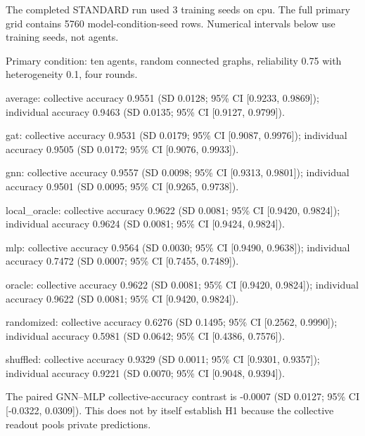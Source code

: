 The completed STANDARD run used 3 training seeds on cpu. The full primary grid contains 5760 model-condition-seed rows. Numerical intervals below use training seeds, not agents.\par
Primary condition: ten agents, random connected graphs, reliability 0.75 with heterogeneity 0.1, four rounds.\par
average: collective accuracy 0.9551 (SD 0.0128; 95\% CI [0.9233, 0.9869]); individual accuracy 0.9463 (SD 0.0135; 95\% CI [0.9127, 0.9799]).\par
gat: collective accuracy 0.9531 (SD 0.0179; 95\% CI [0.9087, 0.9976]); individual accuracy 0.9505 (SD 0.0172; 95\% CI [0.9076, 0.9933]).\par
gnn: collective accuracy 0.9557 (SD 0.0098; 95\% CI [0.9313, 0.9801]); individual accuracy 0.9501 (SD 0.0095; 95\% CI [0.9265, 0.9738]).\par
local\_oracle: collective accuracy 0.9622 (SD 0.0081; 95\% CI [0.9420, 0.9824]); individual accuracy 0.9624 (SD 0.0081; 95\% CI [0.9424, 0.9824]).\par
mlp: collective accuracy 0.9564 (SD 0.0030; 95\% CI [0.9490, 0.9638]); individual accuracy 0.7472 (SD 0.0007; 95\% CI [0.7455, 0.7489]).\par
oracle: collective accuracy 0.9622 (SD 0.0081; 95\% CI [0.9420, 0.9824]); individual accuracy 0.9622 (SD 0.0081; 95\% CI [0.9420, 0.9824]).\par
randomized: collective accuracy 0.6276 (SD 0.1495; 95\% CI [0.2562, 0.9990]); individual accuracy 0.5981 (SD 0.0642; 95\% CI [0.4386, 0.7576]).\par
shuffled: collective accuracy 0.9329 (SD 0.0011; 95\% CI [0.9301, 0.9357]); individual accuracy 0.9221 (SD 0.0070; 95\% CI [0.9048, 0.9394]).\par
The paired GNN--MLP collective-accuracy contrast is -0.0007 (SD 0.0127; 95\% CI [-0.0322, 0.0309]). This does not by itself establish H1 because the collective readout pools private predictions.\par
